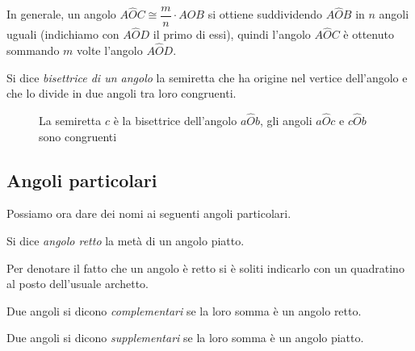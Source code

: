 In generale, un angolo $A\widehat{O}C\cong\dfrac{m}{n}\cdot A\widehat{O}B$ si ottiene suddividendo $A\widehat{O}B$ in $n$ angoli uguali (indichiamo con $A\widehat{O}D$ il primo di essi), quindi l'angolo $A\widehat{O}C$ è ottenuto sommando $m$ volte l'angolo $A\widehat{O}D$.

\begin{definizione}
Si dice \emph{bisettrice di un angolo} la semiretta che ha origine nel vertice dell'angolo e che lo divide in due angoli tra loro congruenti.
\end{definizione}

\begin{figure}[htb]
\centering
\caption{La semiretta $c$ è la bisettrice dell'angolo $a\widehat{O}b$, gli angoli $a\widehat{O}c$ e $c\widehat{O}b$ sono congruenti}
\end{figure}

\subsection{Angoli particolari}

Possiamo ora dare dei nomi ai seguenti angoli particolari.

\begin{definizione}
Si dice \emph{angolo retto} la metà di un angolo piatto.
\end{definizione}

Per denotare il fatto che un angolo è retto si è soliti indicarlo con un quadratino al posto dell'usuale archetto.

\begin{figure}[htb]
\centering
\end{figure}

\begin{definizione}
Due angoli si dicono \emph{complementari} se la loro somma è un angolo retto.
\end{definizione}

\begin{figure}[htb]
\centering
\end{figure}

\begin{definizione}
Due angoli si dicono \emph{supplementari} se la loro somma è un angolo piatto.
\end{definizione}

\begin{figure}[htb]
\centering
\end{figure}

